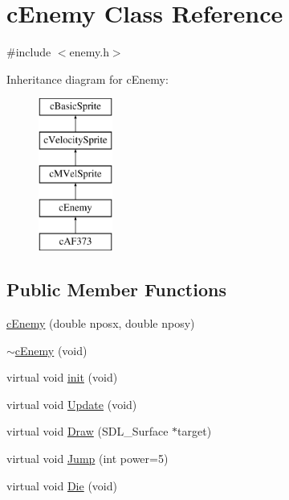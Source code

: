 \hypertarget{classc_enemy}{\section{c\-Enemy Class Reference}
\label{classc_enemy}
}


{\ttfamily \#include $<$enemy.\-h$>$}

Inheritance diagram for c\-Enemy\-:\begin{figure}[H]
\begin{center}
\leavevmode
\includegraphics[height=5.000000cm]{classc_enemy}
\end{center}
\end{figure}
\subsection*{Public Member Functions}
\begin{DoxyCompactItemize}
\item 
\hyperlink{classc_enemy_a7418f807e9a0180e2a9e7d57365acda1}{c\-Enemy} (double nposx, double nposy)
\item 
\hyperlink{classc_enemy_a045bed08683deb6e3b9ce89cdb5f38a9}{$\sim$c\-Enemy} (void)
\item 
virtual void \hyperlink{classc_enemy_ad43a7bf539bec2be57bbdbf02fa25f9f}{init} (void)
\item 
virtual void \hyperlink{classc_enemy_af63fe08e8a91d670c29c81b4dae76cc7}{Update} (void)
\item 
virtual void \hyperlink{classc_enemy_a320a23b20a57397271e7081071e0d557}{Draw} (S\-D\-L\-\_\-\-Surface $\ast$target)
\item 
virtual void \hyperlink{classc_enemy_a439ec2c3f7ff12f154de3e1ec9e42f65}{Jump} (int power=5)
\item 
virtual void \hyperlink{classc_enemy_ab9959c970d97265938fecec544d5fa49}{Die} (void)
\end{DoxyCompactItemize}
